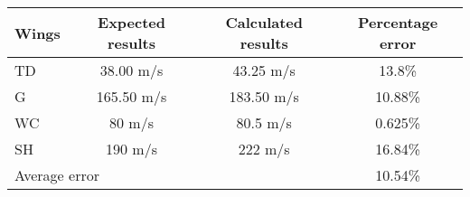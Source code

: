 \documentclass{standalone}
\begin{document}
    \centering
    \begin{tabular}{l c c c}
    \toprule
    \toprule
    Wings&Expected results&Calculated results&Percentage error\\
    \midrule
    TD & 38.00 m/s & 43.25 m/s & 13.8\% \\
    G & 165.50 m/s & 183.50 m/s & 10.88\% \\
    WC & 80 m/s & 80.5 m/s & 0.625\% \\
    SH & 190 m/s & 222 m/s & 16.84\%\\
    \midrule
    \multicolumn{2}{l}{Average error} & & 10.54\%\\
    \bottomrule
    \bottomrule
    \end{tabular}
    
\end{document}
